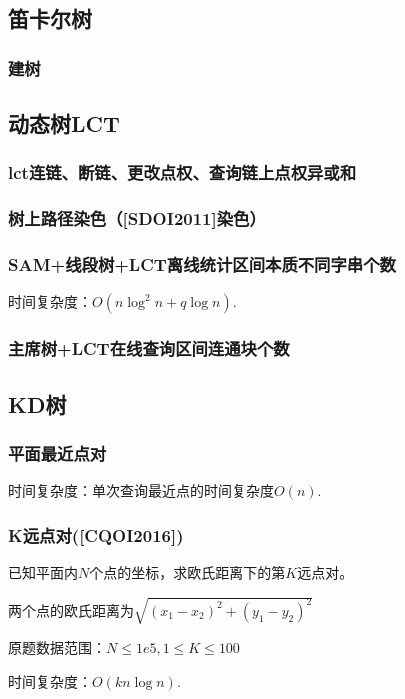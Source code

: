 \documentclass[twoside,a4paper]{article}
\begin{document}
\subsection{笛卡尔树}
\subsubsection{建树}



\subsection{动态树LCT}

\subsubsection{lct连链、断链、更改点权、查询链上点权异或和}


\subsubsection{树上路径染色（[SDOI2011]染色）}


\subsubsection{SAM+线段树+LCT离线统计区间本质不同字串个数}
时间复杂度：$O(n\log^{2}n+q\log n)$.


\subsubsection{主席树+LCT在线查询区间连通块个数}


\subsection{KD树}

\subsubsection{平面最近点对}
时间复杂度：单次查询最近点的时间复杂度$O(n).$


\subsubsection{K远点对([CQOI2016])}
已知平面内$N$个点的坐标，求欧氏距离下的第$K$远点对。\par
两个点的欧氏距离为$\sqrt{(x_1-x_2)^{2}+(y_1-y_2)^{2}}$\par
原题数据范围：$N\leq 1e5, 1\leq K\leq 100$\par
时间复杂度：$O(kn\log{n}).$

\end{document}
